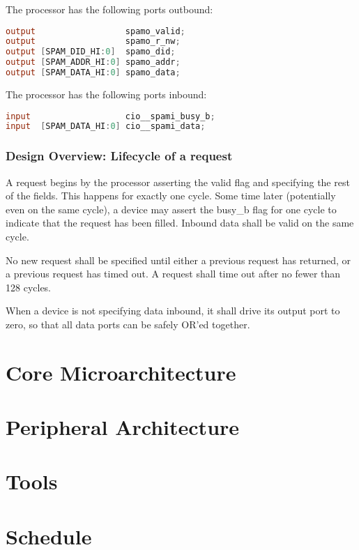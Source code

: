 \documentclass[10pt,twocolumn]{article}
\begin{document}
The processor has the following ports outbound:

\begin{lstlisting}[basicstyle=\footnotesize,language=Verilog]
output                  spamo_valid;
output                  spamo_r_nw;
output [SPAM_DID_HI:0]  spamo_did;
output [SPAM_ADDR_HI:0] spamo_addr;
output [SPAM_DATA_HI:0] spamo_data;
\end{lstlisting}

The processor has the following ports inbound:

\begin{lstlisting}[basicstyle=\footnotesize,language=Verilog]
input                   cio__spami_busy_b;
input  [SPAM_DATA_HI:0] cio__spami_data;
\end{lstlisting}

\subsubsection{Design Overview: Lifecycle of a request}

A request begins by the processor asserting the valid flag and specifying
the rest of the fields. This happens for exactly one cycle. Some time later
(potentially even on the same cycle), a device may assert the busy\_b flag
for one cycle to indicate that the request has been filled. Inbound data
shall be valid on the same cycle.

No new request shall be specified until either a previous request has
returned, or a previous request has timed out. A request shall time out
after no fewer than 128 cycles.

When a device is not specifying data inbound, it shall drive its output port
to zero, so that all data ports can be safely OR'ed together.

\section{Core Microarchitecture}

\section{Peripheral Architecture}

\section{Tools}

\section{Schedule}
\end{document}
